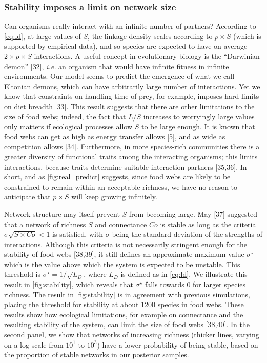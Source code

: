 \documentclass[12pt]{article}
\begin{document}
\hypertarget{stability-imposes-a-limit-on-network-size}{%
\subsubsection{Stability imposes a limit on network
size}\label{stability-imposes-a-limit-on-network-size}}

Can organisms really interact with an infinite number of partners?
According to \cref{eq:ld}, at large values of \(S\), the linkage density
scales according to \(p\times S\) (which is supported by empirical
data), and so species are expected to have on average
\(2\times p\times S\) interactions. A useful concept in evolutionary
biology is the ``Darwinian demon'' {[}32{]}, \emph{i.e.} an organism
that would have infinite fitness in infinite environments. Our model
seems to predict the emergence of what we call Eltonian demons, which
can have arbitrarily large number of interactions. Yet we know that
constraints on handling time of prey, for example, imposes hard limits
on diet breadth {[}33{]}. This result suggests that there are other
limitations to the size of food webs; indeed, the fact that \(L/S\)
increases to worryingly large values only matters if ecological
processes allow \(S\) to be large enough. It is known that food webs can
get as high as energy transfer allows {[}5{]}, and as wide as
competition allows {[}34{]}. Furthermore, in more species-rich
communities there is a greater diversity of functional traits among the
interacting organisms; this limits interactions, because traits
determine suitable interaction partners {[}35,36{]}. In short, and as
\cref{fig:real_predict} suggests, since food webs are likely to be
constrained to remain within an acceptable richness, we have no reason
to anticipate that \(p\times S\) will keep growing infinitely.

Network structure may itself prevent \(S\) from becoming large. May
{[}37{]} suggested that a network of richness \(S\) and connectance
\(Co\) is stable as long as the criteria
\(\sigma \sqrt{S \times Co} < 1\) is satisfied, with \(\sigma\) being
the standard deviation of the strengths of interactions. Although this
criteria is not necessarily stringent enough for the stability of food
webs {[}38,39{]}, it still defines an approximate maximum value
\(\sigma^\star\) which is the value above which the system is expected
to be unstable. This threshold is \(\sigma^\star = 1/\sqrt{L_D}\), where
\(L_D\) is defined as in \cref{eq:ld}. We illustrate this result in
\cref{fig:stability}, which reveals that \(\sigma^\star\) falls towards
0 for larger species richness. The result in \cref{fig:stability} is in
agreement with previous simulations, placing the threshold for stability
at about 1200 species in food webs. These results show how ecological
limitations, for example on connectance and the resulting stability of
the system, can limit the size of food webs {[}38,40{]}. In the second
panel, we show that networks of increasing richness (thicker lines,
varying on a log-scale from \(10^1\) to \(10^3\)) have a lower
probability of being stable, based on the proportion of stable networks
in our posterior samples.
\end{document}
